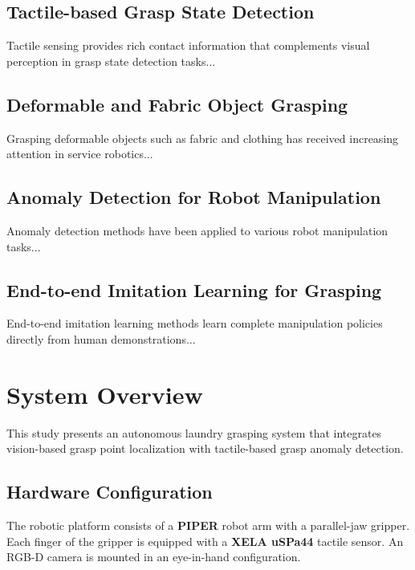 \documentclass[pdflatex,sn-mathphys-num]{sn-jnl}%
\theoremstyle{thmstyleone}%
\theoremstyle{thmstyletwo}%
\theoremstyle{thmstylethree}%
\begin{document}
\subsection{Tactile-based Grasp State Detection}
Tactile sensing provides rich contact information that complements visual perception in grasp state detection tasks...

\subsection{Deformable and Fabric Object Grasping}
Grasping deformable objects such as fabric and clothing has received increasing attention in service robotics...

\subsection{Anomaly Detection for Robot Manipulation}
Anomaly detection methods have been applied to various robot manipulation tasks...

\subsection{End-to-end Imitation Learning for Grasping}
End-to-end imitation learning methods learn complete manipulation policies directly from human demonstrations...

\section{System Overview}\label{sec:overview}
This study presents an autonomous laundry grasping system that integrates vision-based grasp point localization with tactile-based grasp anomaly detection.

\subsection{Hardware Configuration}\label{sec:hardware}
The robotic platform consists of a \textbf{PIPER} robot arm with a parallel-jaw gripper. Each finger of the gripper is equipped with a \textbf{XELA uSPa44} tactile sensor. An RGB-D camera is mounted in an eye-in-hand configuration.
\end{document}
